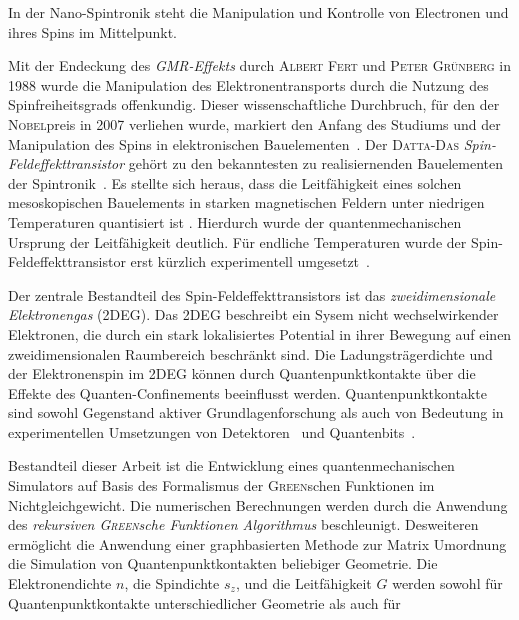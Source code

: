 In der Nano-Spintronik steht die Manipulation und Kontrolle von Electronen und ihres Spins im Mittelpunkt.\par
Mit der Endeckung des \emph{GMR-Effekts} durch \textsc{Albert Fert} und \textsc{Peter Gr\"unberg} in 1988 wurde die Manipulation des Elektronentransports durch die Nutzung des Spinfreiheitsgrads offenkundig. Dieser wissenschaftliche Durchbruch, f\"ur den der \textsc{Nobel}preis in 2007 verliehen wurde, markiert den Anfang des Studiums und der Manipulation des Spins in elektronischen Bauelementen~\cite{evegeny2010spin}. Der \textsc{Datta-Das} \emph{Spin-Feldeffekttransistor} geh\"ort zu den bekanntesten zu realisiernenden Bauelementen der Spintronik~\cite{datta:665}. Es stellte sich heraus, dass die Leitf\"ahigkeit eines solchen mesoskopischen Bauelements in starken magnetischen Feldern unter niedrigen Temperaturen quantisiert ist \cite{PhysRevLett.45.494}. Hierdurch wurde der quantenmechanischen Ursprung der Leitf\"ahigkeit deutlich. F\"ur endliche Temperaturen wurde der Spin-Feldeffekttransistor erst k\"urzlich experimentell umgesetzt~\cite{Wunderlich24122010}.\par
Der zentrale Bestandteil des Spin-Feldeffekttransistors ist das \emph{zweidimensionale Elektronengas} (2DEG). Das 2DEG beschreibt ein Sysem nicht wechselwirkender Elektronen, die durch ein stark lokalisiertes Potential in ihrer Bewegung auf einen zweidimensionalen Raumbereich beschr\"ankt sind. Die Ladungstr\"agerdichte und der Elektronenspin im 2DEG k\"onnen durch Quantenpunktkontakte \"uber die Effekte des Quanten-Confinements beeinflusst werden. Quantenpunktkontakte sind sowohl Gegenstand aktiver Grundlagenforschung als auch von Bedeutung in experimentellen Umsetzungen von Detektoren~\cite{PhysRevB.67.161308} und Quantenbits~\cite{PhysRevA.57.120}.\par
Bestandteil dieser Arbeit ist die Entwicklung eines quantenmechanischen Simulators auf Basis des Formalismus der \textsc{Green}schen Funktionen im Nichtgleichgewicht. Die numerischen Berechnungen werden durch die Anwendung des \emph{rekursiven \textsc{Green}sche Funktionen Algorithmus} beschleunigt. Desweiteren erm\"oglicht die Anwendung einer graphbasierten Methode zur Matrix Umordnung die Simulation von Quantenpunktkontakten beliebiger Geometrie. Die Elektronendichte $n$, die Spindichte $s_z$, und die Leitf\"ahigkeit $G$ werden sowohl f\"ur Quantenpunktkontakte unterschiedlicher Geometrie als auch f\"ur 
